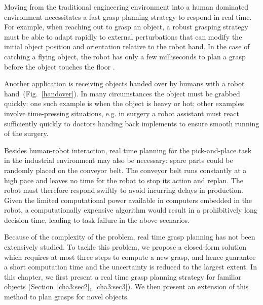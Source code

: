 Moving from the traditional engineering environment into a human dominated environment necessitates a fast grasp planning strategy to respond in real time. For example, when reaching out to grasp an object, a robust grasping strategy must be able to adapt rapidly to external perturbations that can modify the initial object position and orientation relative to the robot hand. In the case of catching a flying object, the robot has only a few milliseconds to plan a grasp before the object touches the floor \citep{kim2012}.

Another application is receiving objects handed over by humans with a robot hand~(Fig.~\ref{handover}). In many circumstances the object must be grabbed quickly: one such example is when the object is heavy or hot; other examples involve time-pressing situations, e.g. in surgery a robot assistant must react sufficiently quickly to doctors handing back implements to ensure smooth running of the surgery.

Besides human-robot interaction, real time planning for the pick-and-place task in the industrial environment may also be necessary: spare parts could be randomly placed on the conveyor belt.
The conveyor belt runs constantly at a high pace and leaves no time for the robot to stop its action and replan.
The robot must therefore respond swiftly to avoid incurring delays in production. Given the limited computational power available in computers embedded in the robot, a computationally expensive algorithm would result in a prohibitively long decision time, leading to task failure in the above scenarios.

Because of the complexity of the problem, real time grasp planning has not been extensively studied. To tackle this problem, we propose a closed-form solution which requires at most three steps to compute a new grasp, and hence guarantee a short computation time and the uncertainty is reduced to the largest extent. In this chapter, we first present a real time grasp planning strategy for familiar objects (Section~\ref{cha3:sec2},~\ref{cha3:sec3}). We then present an extension of this method to plan grasps for novel objects.



